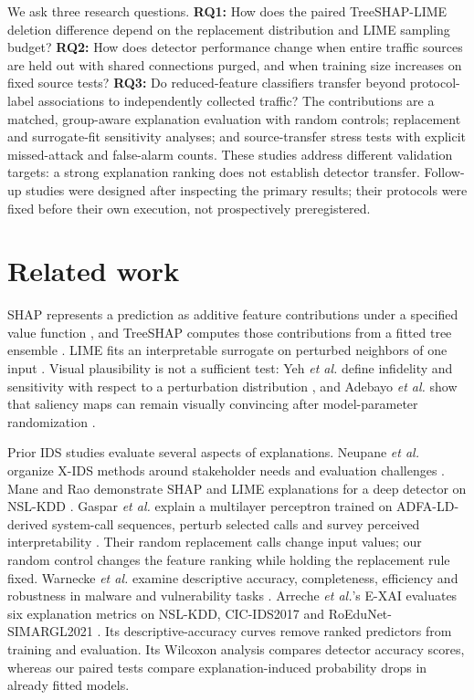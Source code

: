 \documentclass[journal,letterpaper]{IEEEtran}
\begin{document}
We ask three research questions. \textbf{RQ1:} How does the paired TreeSHAP-LIME deletion difference depend on the replacement distribution and LIME sampling budget? \textbf{RQ2:} How does detector performance change when entire traffic sources are held out with shared connections purged, and when training size increases on fixed source tests? \textbf{RQ3:} Do reduced-feature classifiers transfer beyond protocol-label associations to independently collected traffic? The contributions are a matched, group-aware explanation evaluation with random controls; replacement and surrogate-fit sensitivity analyses; and source-transfer stress tests with explicit missed-attack and false-alarm counts. These studies address different validation targets: a strong explanation ranking does not establish detector transfer. Follow-up studies were designed after inspecting the primary results; their protocols were fixed before their own execution, not prospectively preregistered.

\section{Related work}
SHAP represents a prediction as additive feature contributions under a specified value function \cite{ref7}, and TreeSHAP computes those contributions from a fitted tree ensemble \cite{ref8}. LIME fits an interpretable surrogate on perturbed neighbors of one input \cite{ref9}. Visual plausibility is not a sufficient test: Yeh \emph{et al.} define infidelity and sensitivity with respect to a perturbation distribution \cite{ref10}, and Adebayo \emph{et al.} show that saliency maps can remain visually convincing after model-parameter randomization \cite{ref11}.

Prior IDS studies evaluate several aspects of explanations. Neupane \emph{et al.} organize X-IDS methods around stakeholder needs and evaluation challenges \cite{ref12}. Mane and Rao demonstrate SHAP and LIME explanations for a deep detector on NSL-KDD \cite{ref13}. Gaspar \emph{et al.} explain a multilayer perceptron trained on ADFA-LD-derived system-call sequences, perturb selected calls and survey perceived interpretability \cite{ref14}. Their random replacement calls change input values; our random control changes the feature ranking while holding the replacement rule fixed. Warnecke \emph{et al.} examine descriptive accuracy, completeness, efficiency and robustness in malware and vulnerability tasks \cite{ref15}. Arreche \emph{et al.}'s E-XAI evaluates six explanation metrics on NSL-KDD, CIC-IDS2017 and RoEduNet-SIMARGL2021 \cite{ref16}. Its descriptive-accuracy curves remove ranked predictors from training and evaluation. Its Wilcoxon analysis compares detector accuracy scores, whereas our paired tests compare explanation-induced probability drops in already fitted models.
\end{document}
